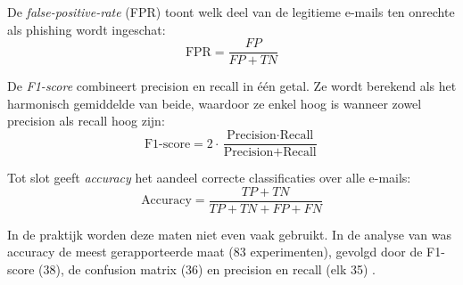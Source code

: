 De \emph{false-positive-rate} (FPR) toont welk deel van de legitieme e-mails ten onrechte als phishing wordt ingeschat:
\begin{equation*}
    \text{FPR} = \frac{FP}{FP + TN}
\end{equation*}

De \emph{F1-score} combineert precision en recall in één getal. Ze wordt berekend als het harmonisch gemiddelde van beide, waardoor ze enkel hoog is wanneer zowel precision als recall hoog zijn:
\begin{equation*}
    \text{F1-score} = 2 \cdot \frac{\text{Precision} \cdot \text{Recall}}{\text{Precision} + \text{Recall}}
\end{equation*}

Tot slot geeft \emph{accuracy} het aandeel correcte classificaties over alle e-mails:
\begin{equation*}
    \text{Accuracy} = \frac{TP + TN}{TP + TN + FP + FN}
\end{equation*}

In de praktijk worden deze maten niet even vaak gebruikt. In de analyse van \textcite{Salloum2022} was accuracy de meest gerapporteerde maat (83 experimenten), gevolgd door de F1-score (38), de confusion matrix (36) en precision en recall (elk 35) \autocite{Salloum2022}.